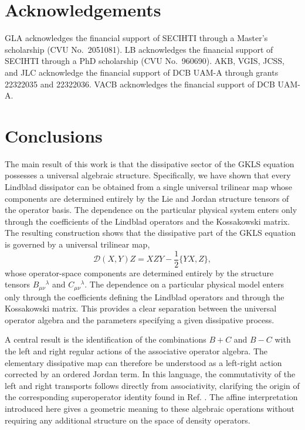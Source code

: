 \documentclass[notitlepage,aip,reprint,onecolumn]{revtex4-1}
\theoremstyle{definition}
\begin{document}
\section{Acknowledgements}\label{sec:Acknowledgements}
GLA acknowledges the financial support of SECIHTI through
a Master's scholarship (CVU No.~2051081).
LB acknowledges the financial support of SECIHTI through
a PhD scholarship (CVU No.~960690).
AKB, VGIS, JCSS, and JLC acknowledge the financial support
of DCB UAM-A through grants 22322035 and 22322036.
VACB acknowledges the financial support of DCB UAM-A.
\section{Conclusions}
The main result of this work is that the dissipative sector of
the GKLS equation possesses a universal algebraic structure.
Specifically, we have shown that every Lindblad dissipator can be
obtained from a single universal trilinear map whose components
are determined entirely by the Lie and Jordan structure tensors
of the operator basis. The dependence on the particular physical
system enters only through the coefficients of the Lindblad
operators and the Kossakowski matrix.
The resulting construction shows that the dissipative part
of the GKLS equation is governed by a universal trilinear map,
\[
\mathcal D(X,Y)Z
=
XZY-\frac12\{YX,Z\},
\]
whose operator-space components are determined entirely by the structure tensors \(B_{\mu\nu}{}^\lambda\) and \(C_{\mu\nu}{}^\lambda\). The dependence on a particular physical model enters only through the coefficients defining the Lindblad operators and through the Kossakowski matrix. This provides a clear separation between the universal operator algebra and the parameters specifying a given dissipative process.

A central result is the identification of the combinations \(B+C\) and \(B-C\) with the left and right regular actions of the associative operator algebra. The elementary dissipative map can therefore be understood as a left-right action corrected by an ordered Jordan term. In this language, the commutativity of the left and right transports follows directly from associativity, clarifying the origin of the corresponding superoperator identity found in Ref. \cite{Bixano:2026qce}. The affine interpretation introduced here gives a geometric meaning to these algebraic operations without requiring any additional structure on the space of density operators.
\end{document}
